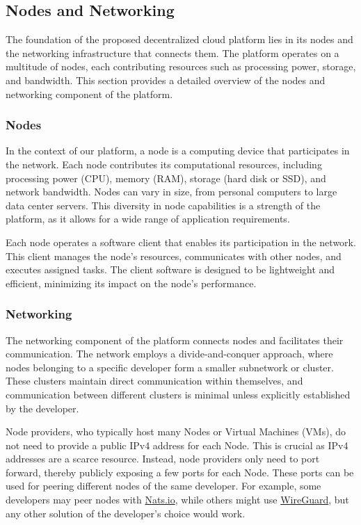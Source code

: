 \subsection{Nodes and Networking}
\label{sec:nodes_and_networking}

The foundation of the proposed decentralized cloud platform lies in its nodes and the networking infrastructure that connects them. The platform operates on a multitude of nodes, each contributing resources such as processing power, storage, and bandwidth. This section provides a detailed overview of the nodes and networking component of the platform.

\subsubsection{Nodes}
\label{subsec:nodes}

In the context of our platform, a node is a computing device that participates in the network. Each node contributes its computational resources, including processing power (CPU), memory (RAM), storage (hard disk or SSD), and network bandwidth. Nodes can vary in size, from personal computers to large data center servers. This diversity in node capabilities is a strength of the platform, as it allows for a wide range of application requirements.

Each node operates a software client that enables its participation in the network. This client manages the node's resources, communicates with other nodes, and executes assigned tasks. The client software is designed to be lightweight and efficient, minimizing its impact on the node's performance.

\subsubsection{Networking}
\label{subsec:networking}

The networking component of the platform connects nodes and facilitates their communication. The network employs a divide-and-conquer approach, where nodes belonging to a specific developer form a smaller subnetwork or cluster. These clusters maintain direct communication within themselves, and communication between different clusters is minimal unless explicitly established by the developer.

Node providers, who typically host many Nodes or Virtual Machines (VMs), do not need to provide a public IPv4 address for each Node. This is crucial as IPv4 addresses are a scarce resource. Instead, node providers only need to port forward, thereby publicly exposing a few ports for each Node. These ports can be used for peering different nodes of the same developer. For example, some developers may peer nodes with \href{https://nats.io/}{Nats.io}, while others might use \href{https://www.wireguard.com/}{WireGuard}, but any other solution of the developer's choice would work.


